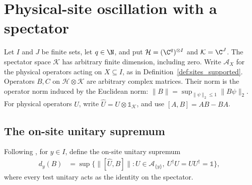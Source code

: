 \section{Physical-site oscillation with a spectator}
\label{sec:qc_site_oscillation}

Let $I$ and $J$ be finite sets, let $q\in\N$, and put
$\mathcal H=(\C^q)^{\otimes I}$ and $\mathcal K=\C^J$.
The spectator space $\mathcal K$ has arbitrary finite dimension, including
zero. Write $\mathcal A_X$ for the physical operators acting on
$X\subseteq I$, as in Definition~\ref{def:sites_supported}.
Operators $B,C$ on $\mathcal H\otimes\mathcal K$ are arbitrary complex
matrices. Their norm is the operator norm induced by the Euclidean norm:
$\|B\|=\sup_{\|\psi\|_2\le1}\|B\psi\|_2$.
For physical operators $U$, write $\widehat U=U\otimes\mathbb 1_{\mathcal K}$,
and use $[A,B]=AB-BA$.

\subsection{The on-site unitary supremum}

\begin{definition}
    \label{def:qc_site_oscillation}
    \leanok
    Following \cite{OpenAI2026AreaLaw}, for $y\in I$, define the on-site
    unitary supremum
    \begin{align}
        d_y(B) & =\sup\bigl\{\|[\widehat U,B]\|:
        U\in\mathcal A_{\{y\}},\ U^\dagger U=UU^\dagger=\mathbb 1\bigr\},
        \label{eq:qc_osc_supremum}
    \end{align}
    where every test unitary acts as the identity on the spectator.
\end{definition}

